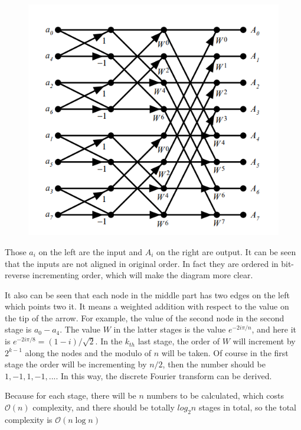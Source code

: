\documentclass{article}
\begin{document}
\begin{figure}[h]
    \centering
    \includegraphics[scale=0.5]{problem38_1.png}
\end{figure}

Those $a_i$ on the left are the input and $A_i$ on the right are output. It can be seen that the inputs are not aligned in original order. In fact they are ordered in bit-reverse incrementing order, which will make the diagram more clear.

It also can be seen that each node in the middle part has two edges on the left which points two it. It means a weighted addition with respect to the value on the tip of the arrow. For example, the value of the second node in the second stage is $a_0-a_4$. The value $W$ in the latter stages is the value $e^{-2i\pi/n}$, and here it is $e^{-2i\pi/8}=(1-i)/\sqrt{2}$. In the $k_{th}$ last stage, the order of $W$ will increment by $2^{k-1}$ along the nodes and the modulo of $n$ will be taken. Of course in the first stage the order will be incrementing by $n/2$, then the number should be $1,-1,1,-1,...$. In this way, the discrete Fourier transform can be derived. 

Because for each stage, there will be $n$ numbers to be calculated, which costs $\mathcal{O}(n)$ complexity, and there should be totally $log_2{n}$ stages in total, so the total complexity is $\mathcal{O}(n\log{n})$
\end{document}
